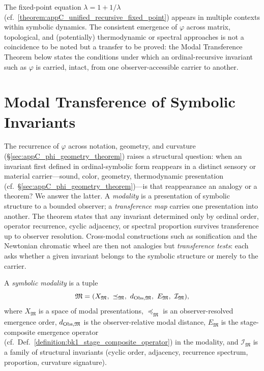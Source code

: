 \begin{remark}
\label{remark:appC_connection_other_modalities}
The fixed-point equation $\lambda = 1 + 1/\lambda$ (cf.~\ref{theorem:appC_unified_recursive_fixed_point}) appears in multiple contexts within symbolic dynamics. The consistent emergence of $\varphi$ across matrix, topological, and (potentially) thermodynamic or spectral approaches is not a coincidence to be noted but a transfer to be proved: the Modal Transference Theorem below states the conditions under which an ordinal-recursive invariant such as $\varphi$ is carried, intact, from one observer-accessible carrier to another.
\end{remark}

\section{Modal Transference of Symbolic Invariants}
\label{sec:appC_modal_transference}
The recurrence of $\varphi$ across notation, geometry, and curvature
(\S\ref{sec:appC_phi_geometry_theorem}) raises a structural question: when an
invariant first defined in ordinal-symbolic form reappears in a distinct
sensory or material carrier---sound, color, geometry, thermodynamic
presentation (cf.~\S\ref{sec:appC_phi_geometry_theorem})---is that reappearance an
analogy or a theorem? We answer the
latter. A \emph{modality} is a presentation of symbolic structure to a bounded
observer; a \emph{transference map} carries one presentation into another. The
theorem states that any invariant determined only by ordinal order, operator
recurrence, cyclic adjacency, or spectral proportion survives transference up to
observer resolution. Cross-modal constructions such as sonification and the
Newtonian chromatic wheel are then not analogies but \emph{transference tests}:
each asks whether a given invariant belongs to the symbolic structure or merely
to the carrier.

\begin{definition}
\label{definition:appC_symbolic_modality}
A \emph{symbolic modality} is a tuple
\[
\mathfrak{M} = (X_\mathfrak{M},\ \preceq_\mathfrak{M},\ d_{\mathrm{Obs},\mathfrak{M}},\
E_\mathfrak{M},\ \mathcal{I}_\mathfrak{M}),
\]
where $X_\mathfrak{M}$ is a space of modal presentations, $\preceq_\mathfrak{M}$
is an observer-resolved emergence order, $d_{\mathrm{Obs},\mathfrak{M}}$ is the
observer-relative modal distance, $E_\mathfrak{M}$ is the stage-composite
emergence operator (cf.~Def.~\ref{definition:bk1_stage_composite_operator}) in
the modality, and $\mathcal{I}_\mathfrak{M}$ is a family of structural invariants
(cyclic order, adjacency, recurrence spectrum, proportion, curvature signature).
\end{definition}

